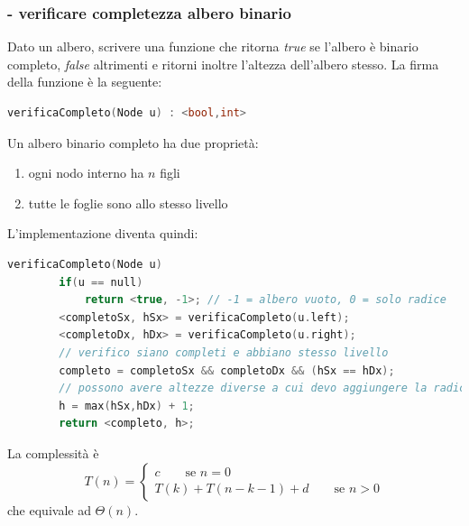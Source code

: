 \documentclass[italian]{article}
\newcommand{\exercize}{\text{\faPencil $\;$ Esercizio }}
\begin{document}
\subsubsection{\exercize - verificare completezza albero binario}
Dato un albero, scrivere una funzione che ritorna \textit{true} se l'albero è binario completo, \textit{false} altrimenti e ritorni inoltre l'altezza dell'albero stesso. La firma della funzione è la seguente:
\begin{lstlisting}[language=c,mathescape=true]
	verificaCompleto(Node u) : <bool,int>
\end{lstlisting}
Un albero binario completo ha due proprietà:
\begin{enumerate}[itemsep=0pt]
	\item ogni nodo interno ha $n$ figli
	\item tutte le foglie sono allo stesso livello
\end{enumerate}
L'implementazione diventa quindi:
\begin{lstlisting}[language=c,mathescape=true]
	verificaCompleto(Node u)
		if(u == null)
			return <true, -1>; // -1 = albero vuoto, 0 = solo radice
		<completoSx, hSx> = verificaCompleto(u.left);
		<completoDx, hDx> = verificaCompleto(u.right);
		// verifico siano completi e abbiano stesso livello
		completo = completoSx && completoDx && (hSx == hDx); 
		// possono avere altezze diverse a cui devo aggiungere la radice
		h = max(hSx,hDx) + 1;
		return <completo, h>;
\end{lstlisting}
La complessità è
\[
	T(n) = 
	\begin{cases*}
		c \qquad\text{se } n=0 \\
		T(k) + T(n-k-1) + d \qquad\text{se } n>0 
	\end{cases*}
\]
che equivale ad $\varTheta(n)$.
\pagebreak
\end{document}
